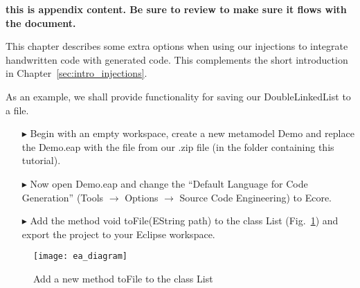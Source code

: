     
{\bf \large this is appendix content. Be sure to review to make sure it flows with the document.}


This chapter describes some extra options when using our injections to integrate handwritten code with generated code. 
This complements the short introduction in Chapter~\ref{sec:intro_injections}.

As an example, we shall provide functionality for saving our \textsf{DoubleLinkedList} to a file.

\begin{enumerate}
  \item[$\blacktriangleright$] Begin with an empty workspace, create a new metamodel \textsf{Demo} and replace the \textsf{Demo.eap} with the file from our .zip
  file (in the folder containing this tutorial).
  \item[$\blacktriangleright$] Now open \textsf{Demo.eap} and change the ``Default Language for Code Generation'' (Tools $\rightarrow$ Options $\rightarrow$
  Source Code Engineering) to \textsf{Ecore}.
  \item[$\blacktriangleright$] Add the method \textsf{void toFile(EString path)} to the class \textsf{List} (Fig.~\ref{fig:append_inj_diagram}) and export the
  project to your Eclipse workspace.
\end{enumerate}
\begin{figure}[htbp]
\begin{center}
  \texttt{[image: ea\_diagram]}
  \caption{Add a new method \textsf{toFile} to the class \textsf{List}}
  \label{fig:append_inj_diagram}
\end{center}
\end{figure}

